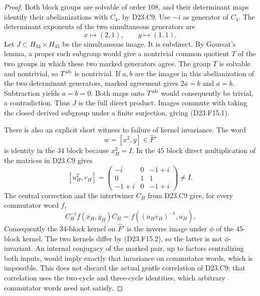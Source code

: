 \begin{proof}
Both block groups are solvable of order $108$, and
their determinant maps identify their abelianizations
with $C_4$, by D23.C9.  Use $-i$ as generator of $C_4$.
The determinant exponents of the two simultaneous
generators are
\[
 x\longmapsto(2,1),\qquad y\longmapsto(1,1).
\]
Let $J\subset H_{34}\times H_{45}$ be the simultaneous
image. It is subdirect. By Goursat's lemma, a proper
such subgroup would give a nontrivial common quotient
$T$ of the two groups in which these two marked
generators agree.  The group $T$ is solvable and
nontrivial, so $T^{\rm ab}$ is nontrivial.  If $a,b$
are the images in this abelianization of the two
determinant generators, marked agreement gives
$2a=b$ and $a=b$.  Subtraction yields $a=b=0$.
Both maps onto $T^{\rm ab}$ would consequently be
trivial, a contradiction.  Thus $J$ is the full
direct product.  Images commute with taking the
closed derived subgroup under a finite surjection,
giving (D23.F15.1).

There is also an explicit short witness to failure
of kernel invariance.  The word
\[
 w=[x^2,y]\in\widehat F'
\]
is identity in the $34$ block because $x_H^2=I$.
In the $45$ block direct multiplication of the
matrices in D23.C9 gives
\[
 [u_H^2,v_H]=
 \begin{pmatrix}
 -i&0&-1+i\\
 0&1&1\\
 -1+i&0&-1+i
 \end{pmatrix}\ne I.
\tag{D23.F15.2}
\]
The central correction and the intertwiner $C_H$
from D23.C9 give, for every commutator word $f$,
\[
 C_H^{-1}f(x_H,y_H)C_H
       =f((u_Hv_H)^{-1},u_H).
\]
Consequently the $34$-block kernel on $\widehat F'$
is the inverse image under $\phi$ of the $45$-block
kernel.  The two kernels differ by (D23.F15.2), so
the latter is not $\phi$-invariant.  An internal
conjugacy of the marked pair, up to factors
centralizing both inputs, would imply exactly that
invariance on commutator words, which is impossible.
This does not discard the actual gentle correlation
of D23.C9: that correlation uses the two-cycle and
three-cycle identities, which arbitrary commutator
words need not satisfy.
\end{proof}
